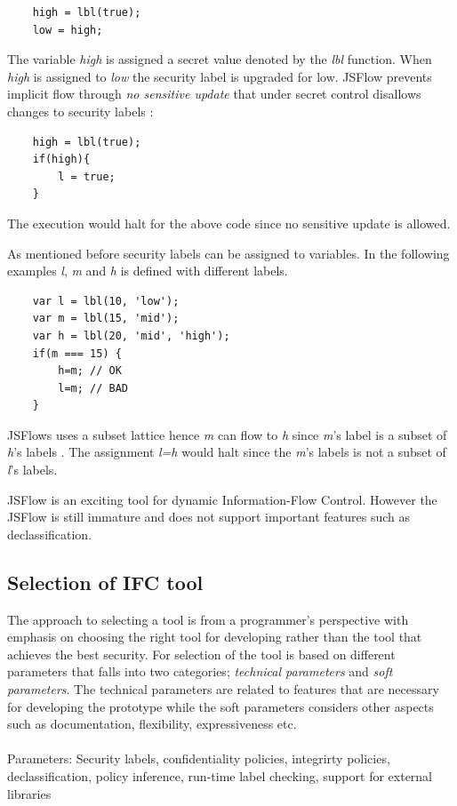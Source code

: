 \begin{lstlisting}
	high = lbl(true);
	low = high;
\end{lstlisting}
 
The variable \emph{high} is assigned a secret value denoted by the \emph{lbl} function. When \emph{high} is assigned to \emph{low} the security label is upgraded for low. JSFlow prevents implicit flow through \emph{no sensitive update} that under secret control disallows changes to security labels \cite{Hedin2014}:

\begin{lstlisting}
	high = lbl(true);
	if(high){
		l = true;
	}
\end{lstlisting}

The execution would halt for the above code since no sensitive update is allowed. 

As mentioned before security labels can be assigned to variables. In the following examples \emph{l}, \emph{m} and \emph{h} is defined with different labels.

\begin{lstlisting}
	var l = lbl(10, 'low');
	var m = lbl(15, 'mid');
	var h = lbl(20, 'mid', 'high');
	if(m === 15) {
		h=m; // OK
		l=m; // BAD
	}
\end{lstlisting}

JSFlows uses a subset lattice hence \emph{m} can flow to \emph{h} since \emph{m}'s label is a subset of \emph{h}'s labels \cite{jsflowsite}. The assignment \emph{l=h} would halt since the \emph{m}'s labels is not a subset of \emph{l}'s labels.


JSFlow is an exciting tool for dynamic Information-Flow Control. However the JSFlow is still immature and does not support important features such as declassification.

\subsection{Selection of IFC tool}
The approach to selecting a tool is from a programmer's perspective with emphasis on choosing the right tool for developing rather than the tool that achieves the best security.
For selection of the tool is based on different parameters that falls into two categories; \emph{technical parameters} and \emph{soft parameters}. The technical parameters are related to features that are necessary for developing the prototype while the soft parameters considers other aspects such as documentation, flexibility, expressiveness etc. 
\\
\\
Parameters: Security labels, confidentiality policies, integrirty policies, declassification, policy inference, run-time label checking, support for external libraries

